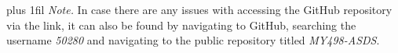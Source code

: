 \documentclass{article}
\begin{document}
\vspace{1em}


\noindent\hspace*{0.5cm}\begin{minipage}{19cm}
\fontsize{10}{12}\selectfont
\leftskip=0pt \rightskip=0pt plus 1fil \parfillskip=0pt
\textit{Note.} In case there are any issues with accessing the GitHub repository via the link, it can also be found by navigating to GitHub, searching the username \textit{50280} and navigating to the public repository titled \textit{MY498-ASDS}.
\end{minipage}
\end{document}
